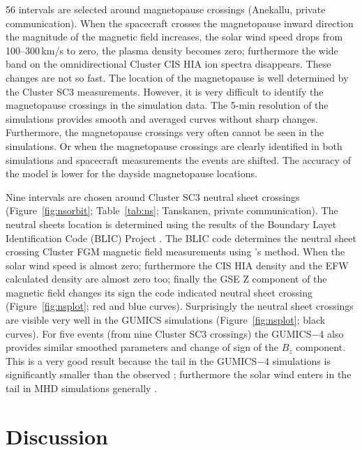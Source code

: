 \documentclass[linenumbers,draft]{agujournal}
\begin{document}
56 intervals are selected around magnetopause crossings (Anekallu, private communication). When the spacecraft crosses the magnetopause inward direction the magnitude of the magnetic field increases, the solar wind speed drops from 100--300\,km/s to zero, the plasma density becomes zero; furthermore the wide band on the omnidirectional Cluster CIS HIA ion spectra disappears. These changes are not so fast. The location of the magnetopause is well determined by the Cluster SC3 measurements. However, it is very difficult to identify the magnetopause crossings in the simulation data. The 5-min resolution of the simulations provides smooth and averaged curves without sharp changes. Furthermore, the magnetopause crossings very often cannot be seen in the simulations. Or when the magnetopause crossings are clearly identified in both simulations and spacecraft measurements the events are shifted. The accuracy of the model is lower for the dayside magnetopause locations. 

Nine intervals are chosen around Cluster SC3 neutral sheet crossings (Figure~\ref{fig:nsorbit}; Table~\ref{tab:ns}; Tanskanen, private communication). The neutral sheets location is determined using the results of the Boundary Layet Identification Code (BLIC) Project \citep{facskoon:_bow_clust}. The BLIC code determines the neutral sheet crossing Cluster FGM magnetic field measurements using \citet{wang94:_signat}'s method. When the solar wind speed is almost zero; furthermore the CIS HIA density and the EFW calculated density are almost zero too; finally the GSE Z component of the magnetic field changes its sign the code indicated neutral sheet crossing (Figure~\ref{fig:nsplot}; red and blue curves). Surprisingly the neutral sheet crossings are visible very well in the GUMICS simulations (Figure~\ref{fig:nsplot}; black curves). For five events (from nine Cluster SC3 crossings) the GUMICS$-$4 also provides similar smoothed parameters and change of sign of the $B_{z}$ component. This is a very good result because the tail in the GUMICS$-$4 simulations is significantly smaller than the observed \citep{gordeev13:_verif_gumic_mhd,facsko16:_one_earth}; furthermore the solar wind enters in the tail in MHD simulations generally \citep{kallio15:_proper}.


\section{Discussion}
\label{sec:discussion}
\end{document}
